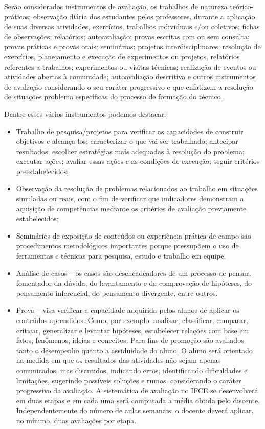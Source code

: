 \documentclass{paper}
\begin{document}
Serão considerados instrumentos de avaliação, os trabalhos de natureza teórico-práticos; observação diária dos estudantes pelos professores, durante a aplicação de suas diversas atividades, exercícios, trabalhos individuais e/ou coletivos; fichas de observações; relatórios; autoavaliação; provas escritas com ou sem consulta; provas práticas e provas orais; seminários; projetos interdisciplinares, resolução de exercícios, planejamento e execução de experimentos ou projetos, relatórios referentes a trabalhos; experimentos ou visitas técnicas; realização de eventos ou atividades abertas à comunidade; autoavaliação descritiva e outros instrumentos de avaliação considerando o seu caráter progressivo e que enfatizem a resolução de situações problema específicas do processo de formação do técnico.

Dentre esses vários instrumentos podemos destacar:
\begin{itemize}
\item Trabalho de pesquisa/projetos para verificar as capacidades de construir objetivos e alcança-los; caracterizar o que vai ser trabalhado; antecipar resultados; escolher estratégias mais adequadas à resolução do problema; executar ações; avaliar essas ações e as condições de execução; seguir critérios preestabelecidos;
\item Observação da resolução de problemas relacionados ao trabalho em situações simuladas ou reais, com o fim de verificar que indicadores demonstram a aquisição de competências mediante os critérios de avaliação previamente estabelecidos;
\item Seminários de exposição de conteúdos ou experiência prática de campo são procedimentos metodológicos importantes porque pressupõem o uso de ferramentas e técnicas para pesquisa, estudo e trabalho em equipe;
\item Análise de casos – os casos são desencadeadores de um processo de pensar, fomentador da dúvida, do levantamento e da comprovação de hipóteses, do pensamento inferencial, do pensamento divergente, entre outros.
\item Prova – visa verificar a capacidade adquirida pelos alunos de aplicar os conteúdos aprendidos. Como, por exemplo: analisar, classificar, comparar, criticar, generalizar e levantar hipóteses, estabelecer relações com base em fatos, fenômenos, ideias e conceitos. Para fins de promoção são avaliados tanto o desempenho quanto a assiduidade do aluno. O aluno será orientado na medida em que os resultados das atividades não sejam apenas comunicados, mas discutidos, indicando erros, identificando dificuldades e limitações, sugerindo possíveis soluções e rumos, considerando o caráter progressivo da avaliação.
A sistemática de avaliação no IFCE se desenvolverá em duas etapas e em cada uma será computada a média obtida pelo discente. Independentemente do número de aulas semanais, o docente deverá aplicar, no mínimo, duas avaliações por etapa. 
\end{itemize}
\end{document}
